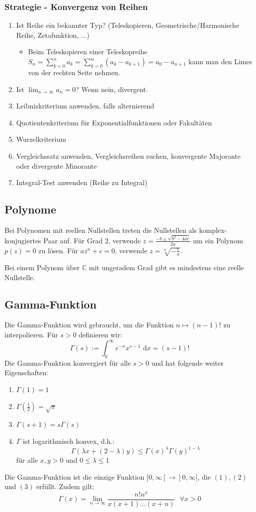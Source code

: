 \documentclass[a4paper,10pt]{article}
\def\limn{\lim_{n\to \infty}}
\def\dx{\text{ d}x}
\begin{document}
\subsubsection{Strategie - Konvergenz von Reihen}
\begin{enumerate}
 \item Ist Reihe ein bekannter Typ? (Teleskopieren, Geometrische/Harmonische Reihe, Zetafunktion, ...){
  \begin{itemize}
    \item Beim Teleskopieren einer Teleskopreihe $S_n = \sum_{k=0}^n a_k = \sum_{k=0}^n (a_k - a_{k+1}) = a_0 - a_{n+1}$ kann man den Limes von der rechten Seite nehmen.
  \end{itemize}
 }
 \item Ist $\limn a_n = 0$? Wenn nein, divergent.
 \item Leibnizkriterium anwenden, falls alternierend
 \item Quotientenkriterium für Exponentialfunktionen oder Fakultäten
 \item Wurzelkriterium
 \item Vergleichssatz anwenden, Vergleichsreihen suchen, konvergente Majorante oder divergente Minorante
 \item Integral-Test anwenden (Reihe zu Integral)
\end{enumerate}


\subsection{Polynome}

Bei Polynomen mit reellen Nullstellen treten die Nullstellen als komplex-konjugiertes Paar auf. Für Grad 2, verwende $z = \frac{-b \pm \sqrt{b^2 - 4ac}}{2a}$ um ein Polynom $p(z) = 0$ zu lösen. Für $a z^n + c = 0$, verwende $z = \sqrt[n]{-\frac{c}{a}}$.

Bei einem Polynom über $\mathbb{C}$ mit ungeradem Grad gibt es mindestens eine reelle Nullstelle.

\subsection{Gamma-Funktion}
Die Gamma-Funktion wird gebraucht, um die Funktion $n \mapsto (n-1)!$ zu interpolieren. Für $s > 0$ definieren wir: $$\Gamma(s) := \int_0^\infty e^{-x}x^{s-1}\dx = (s-1)!$$
Die Gamma-Funktion konvergiert für alle $s > 0$ und hat folgende weiter Eigenschaften:
\begin{enumerate}
  \item $\Gamma(1) = 1$
  \item $\Gamma(\frac{1}{2}) = \sqrt{\pi}$
  \item $\Gamma(s + 1) = s \Gamma(s)$
  \item $\Gamma$ ist logarithmisch konvex, d.h.: $$\Gamma(\lambda x + (2 - \lambda)y) \leq \Gamma(x)^\lambda \Gamma(y)^{1 - \lambda}$$ für alle $x, y > 0$ und $0 \leq \lambda \leq 1$
\end{enumerate}
Die Gamma-Funktion ist die einzige Funktion $]0, \infty[ \to ]0, \infty[$, die $(1), (2)$ und $(3)$ erfüllt. Zudem gilt: $$\Gamma(x) = \limn \frac{n!n^x}{x(x+1)...(x+n)} \ \ \ \forall x > 0$$
\end{document}
